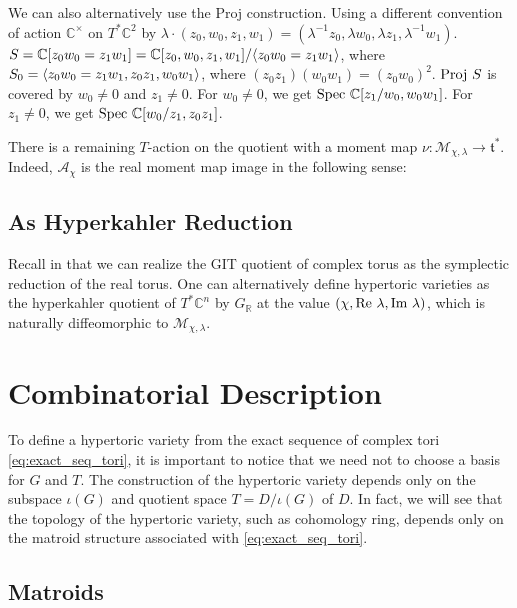 \documentclass[b5paper]{article}
\newcommand{\MM}{\mathcal{M}}
\newcommand{\Proj}{\textnormal{Proj }}
\newcommand{\Spec}{\textnormal{Spec }}
\begin{document}
\begin{example}[exp:]{}
  We can also alternatively use the Proj construction. Using a different convention of action $\mathbb{C}^\times $ on $T^*\mathbb{C}^2$ by $\lambda\cdot (z_0,w_0,z_1,w_1)=(\lambda^{-1}z_0,\lambda w_0,\lambda z_1,\lambda^{-1}w_1)$. $S=\mathbb{C}[z_0w_0=z_1w_1]=\mathbb{C}[z_0,w_0,z_1,w_1]/\langle z_0w_0=z_1w_1\rangle$, where $S_0=\langle z_0w_0=z_1w_1, z_0z_1,w_0w_1\rangle$, where $(z_0z_1)(w_0w_1)=(z_0w_0)^2$. $\Proj S$ is covered by $w_0\neq 0$ and $z_1\neq 0$. For $w_0\neq 0$, we get $\Spec \mathbb{C}[z_1/w_0,w_0w_1]$. For $z_1\neq 0$, we get $\Spec\mathbb{C}[w_0/z_1,z_0z_1]$.
\end{example}

There is a remaining $T$-action on the quotient with a moment map $ \nu : \mathcal{M}_{\chi, \lambda} \to \mathfrak{t}^* $.
Indeed, $\mathcal{A}_\chi$ is the real moment map image in the following sense:
\missing{}


\subsection{As Hyperkahler Reduction}

Recall in  that we can realize the GIT quotient of complex torus as the symplectic reduction of the real torus. One can alternatively define hypertoric varieties as the hyperkahler quotient of $T^*\mathbb{C}^n$ by $G_\mathbb{R}$ at the value $(\chi,\textnormal{Re }\lambda,\textnormal{Im }\lambda)$, which is naturally diffeomorphic to $\MM_{\chi,\lambda}$.

\section{Combinatorial Description}

To define a hypertoric variety from the exact sequence of complex tori \ref{eq:exact_seq_tori}, it is important to notice that we need not to choose a basis for $G$ and $T$. The construction of the hypertoric variety depends only on the subspace $\iota(G)$ and quotient space $T=D/\iota(G)$ of $D$.
In fact, we will see that the topology of the hypertoric variety, such as cohomology ring, depends only on the matroid structure associated with \ref{eq:exact_seq_tori}. 

\subsection{Matroids}
\end{document}
